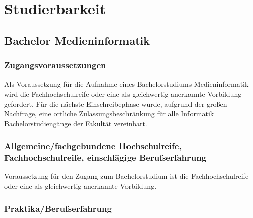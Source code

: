 \chapter{Studierbarkeit\label{/mi-2017/selbstbericht/0500-studierbarkeit/0000-studierbarkeit}}\label{studierbarkeitpathlabelmi-2017selbstbericht0500-studierbarkeit0000-studierbarkeit}

\section{Bachelor
Medieninformatik\label{/mi-2017/selbstbericht/0500-studierbarkeit/0000-studierbarkeit}}\label{bachelor-medieninformatikpathlabelmi-2017selbstbericht0500-studierbarkeit0000-studierbarkeit}

\subsection{Zugangsvoraussetzungen\label{/mi-2017/selbstbericht/0500-studierbarkeit/0000-studierbarkeit}}\label{zugangsvoraussetzungenpathlabelmi-2017selbstbericht0500-studierbarkeit0000-studierbarkeit}

Als Voraussetzung für die Aufnahme eines Bachelorstudiums
Medieninformatik wird die Fachhochschulreife oder eine als gleichwertig
anerkannte Vorbildung gefordert. Für die nächste Einschreibephase wurde,
aufgrund der großen Nachfrage, eine ortliche Zulassungsbeschränkung für
alle Informatik Bachelorstudiengänge der Fakultät vereinbart.

\subsection{Allgemeine/fachgebundene Hochschulreife,
Fachhochschulreife, einschlägige
Berufserfahrung\label{/mi-2017/selbstbericht/0500-studierbarkeit/0000-studierbarkeit}}\label{allgemeinefachgebundene-hochschulreife-fachhochschulreife-einschluxe4gige-berufserfahrungpathlabelmi-2017selbstbericht0500-studierbarkeit0000-studierbarkeit}

Voraussetzung für den Zugang zum Bachelorstudium ist die
Fachhochschulreife oder eine als gleichwertig anerkannte Vorbildung.

\subsection{Praktika/Berufserfahrung\label{/mi-2017/selbstbericht/0500-studierbarkeit/0000-studierbarkeit}}\label{praktikaberufserfahrungpathlabelmi-2017selbstbericht0500-studierbarkeit0000-studierbarkeit}

